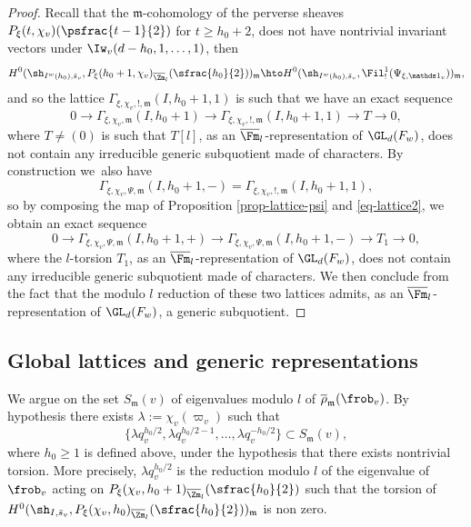 \begin{enumeratea}
\begin{proof}
Recall that the $\mathfrak m$-cohomology of the perverse sheaves
$P_\xi(t,\chi_v)(\psfrac{t-1}{2})$
for $t \geq h_0+2$, does not have nontrivial invariant vectors under
$\Iw_v(d-h_0,1,\dots,1)$, then
\[
H^0(\sh_{I^w(h_0),\bar s_v},P_\xi(h_0+1,\chi_v)_{\overline \Zm_l}(\sfrac{h_0}{2}))_{\mathfrak m}
\hto H^0(\sh_{I^w(h_0),\bar s_v},\Fil^1_!(\Psi_{\xi,\mathds 1_v}))_{\mathfrak m},
\]
and so the lattice $\Gamma_{\xi,\chi_v,!,\mathfrak m}(I,h_0+1,1)$
is such that we have an exact sequence
\begin{equation} \label{eq-lattice2}
0 \to \Gamma_{\xi,\chi_v,\mathfrak m}(I,h_0+1)
\to \Gamma_{\xi,\chi_v,!,\mathfrak m}
(I,h_0+1,1) \to T \to 0,
\end{equation}
where $T \neq (0)$ is such that $T[l]$, as an $\overline \Fm_l$-representation of
$\GL_d(F_w)$, does not contain any
irreducible generic subquotient made of characters.
By construction we~also have
\[
\Gamma_{\xi,\chi_v,\Psi,\mathfrak m}(I,h_0+1,-)=
\Gamma_{\xi,\chi_v,!,\mathfrak m}(I,h_0+1,1),
\]
so by composing the map of Proposition \ref{prop-lattice-psi}
and \eqref{eq-lattice2}, we obtain an exact sequence
\[
0 \to \Gamma_{\xi,\chi_v,\Psi,\mathfrak m}(I,h_0+1,+) \to
\Gamma_{\xi,\chi_v,\Psi,\mathfrak m}(I,h_0+1,-) \to T_1 \to 0,
\]
where the $l$-torsion $T_1$, as an $\overline \Fm_l$-representation of
$\GL_d(F_w)$, does not contain any
irreducible generic subquotient made of characters. We then conclude from
the fact that the modulo
$l$ reduction of these two lattices admits, as an $\overline \Fm_l$-representation of
$\GL_d(F_w)$, a generic subquotient.
\end{proof}
\end{enumeratea}

\subsection{Global lattices and generic representations}
\label{para-final}

We argue on the set $S_{\mathfrak m}(v)$ of eigenvalues modulo $l$ of
$\overline \rho_{\mathfrak m}(\frob_v)$.
By hypothesis there exists $\lambda:=\chi_v(\varpi_v)$ such that
\[
\{\lambda q_v^{h_0/2},\lambda q_v^{h_0/2-1},\dots,\lambda q_v^{-h_0/2}\}
\subset S_{\mathfrak m}(v),
\]
where $h_0 \geq 1$ is defined above, under the hypothesis that there exists nontrivial torsion. More precisely, $\lambda q_v^{h_0/2}$ is the reduction modulo $l$
of the eigenvalue of $\frob_v$ acting on $P_\xi(\chi_v,h_0+1)_{\overline \Zm_l}(\sfrac{h_0}{2})$
such that the torsion of $H^0(\sh_{I,\bar s_v},P_\xi(\chi_v,h_0)_{\overline \Zm_l}(\sfrac{h_0}{2}))_{\mathfrak m}$
is non zero.

